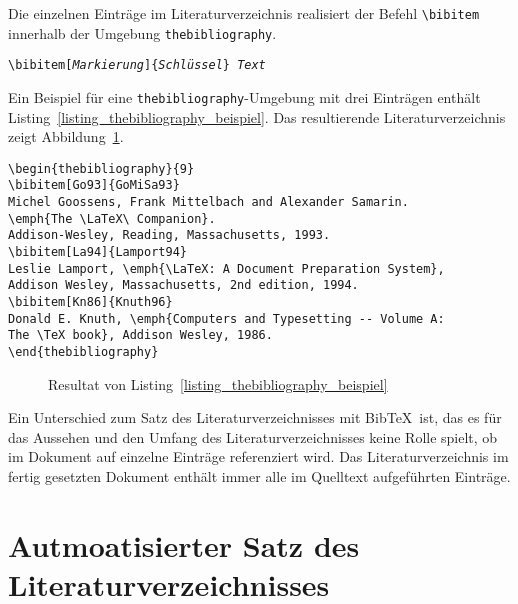 Die einzelnen Einträge im Literaturverzeichnis realisiert der Befehl \verb|\bibitem| innerhalb der Umgebung \verb!thebibliography!. 

\begin{boxedminipage}{\textwidth}
	\texttt{\textbackslash bibitem[\textsl{Markierung}]\{\textsl{Schlüssel}\} \textsl{Text}} 
\end{boxedminipage}

Ein Beispiel für eine \verb!thebibliography!-Umgebung mit drei Einträgen enthält Listing~\ref{listing_thebibliography_beispiel}. Das resultierende Literaturverzeichnis zeigt Abbildung~\ref{fig_thebibliography_beispiel}.

\begin{lstlisting}[caption={Ein Literaturverzeichnis mit der Umgebung \texttt{thebibliography}},label=listing_thebibliography_beispiel, style=customlatex]
\begin{thebibliography}{9}
\bibitem[Go93]{GoMiSa93} 
Michel Goossens, Frank Mittelbach and Alexander Samarin. 
\emph{The \LaTeX\ Companion}. 
Addison-Wesley, Reading, Massachusetts, 1993.
\bibitem[La94]{Lamport94}
Leslie Lamport,	\emph{\LaTeX: A Document Preparation System},	
Addison Wesley, Massachusetts, 2nd edition, 1994.
\bibitem[Kn86]{Knuth96} 
Donald E. Knuth, \emph{Computers and Typesetting -- Volume A: 
The \TeX book}, Addison Wesley, 1986.
\end{thebibliography}
\end{lstlisting}

\begin{figure}[H]
	\caption{Resultat von Listing~\ref{listing_thebibliography_beispiel}}
	\label{fig_thebibliography_beispiel}
\end{figure}

Ein Unterschied zum Satz des Literaturverzeichnisses mit Bib\TeX\ ist, das es für das Aussehen und den Umfang des Literaturverzeichnisses keine Rolle spielt, ob im Dokument auf einzelne Einträge referenziert wird. 
Das Literaturverzeichnis im fertig gesetzten Dokument enthält immer alle im Quelltext aufgeführten Einträge.

\section{Autmoatisierter Satz des Literaturverzeichnisses}
\label{Abschnitt_bibtex}

